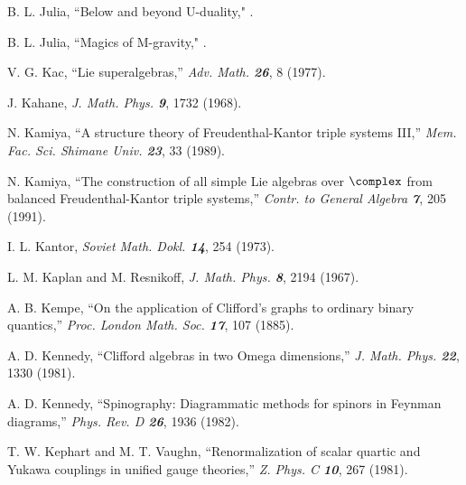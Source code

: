  B. L. Julia,
    ``Below and beyond U-duality,"
.

 B. L. Julia,
    ``Magics of M-gravity,"
.



V. G. Kac,
``Lie superalgebras,''
{\em Adv.  Math.    \bf 26}, 8 (1977).

 J. Kahane,
{\em J. Math. Phys.   \bf 9}, 1732 (1968).

 N. Kamiya,
``A structure theory of Freudenthal-Kantor triple systems III,''
{\em Mem. Fac. Sci. Shimane Univ. \bf 23}, 33 (1989).   %

 N. Kamiya,
``The construction of all simple Lie algebras
over $\complex$ from balanced Freudenthal-Kantor triple systems,''
{\em Contr. to General Algebra \bf 7}, 205 (1991).      %

 I. L. Kantor,
{\em Soviet Math. Dokl.  \bf 14}, 254 (1973).

L. M. Kaplan and M. Resnikoff,
{\em J. Math. Phys.  \bf 8}, 2194 (1967).

 A. B. Kempe,
``On the application of Clifford's graphs to ordinary
  binary quantics,''
{\em Proc. London Math. Soc. \bf 17}, 107 (1885). %

A. D. Kennedy,
``Clifford algebras in two Omega dimensions,''
{\em J.  Math.  Phys.    \bf 22}, 1330 (1981).

A. D. Kennedy,
``Spinography: Diagrammatic methods for spinors in Feynman diagrams,''
{\em Phys.  Rev.  D \bf 26}, 1936 (1982).

%
T. W. Kephart and M. T. Vaughn,
``Renormalization of scalar quartic and Yukawa couplings
in unified gauge theories,''
{\em Z.  Phys. C   \bf 10}, 267 (1981).


